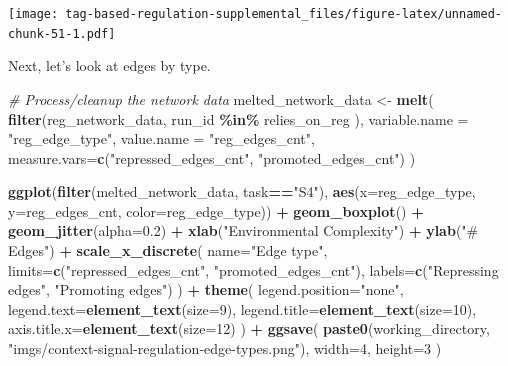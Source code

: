 \documentclass[
]{book}
\newenvironment{Shaded}{\begin{snugshade}}{\end{snugshade}}
\newcommand{\CommentTok}[1]{\textcolor[rgb]{0.56,0.35,0.01}{\textit{#1}}}
\newcommand{\DataTypeTok}[1]{\textcolor[rgb]{0.13,0.29,0.53}{#1}}
\newcommand{\DecValTok}[1]{\textcolor[rgb]{0.00,0.00,0.81}{#1}}
\newcommand{\FloatTok}[1]{\textcolor[rgb]{0.00,0.00,0.81}{#1}}
\newcommand{\KeywordTok}[1]{\textcolor[rgb]{0.13,0.29,0.53}{\textbf{#1}}}
\newcommand{\NormalTok}[1]{#1}
\newcommand{\OperatorTok}[1]{\textcolor[rgb]{0.81,0.36,0.00}{\textbf{#1}}}
\newcommand{\StringTok}[1]{\textcolor[rgb]{0.31,0.60,0.02}{#1}}
\begin{document}
\texttt{[image: tag-based-regulation-supplemental\_files/figure-latex/unnamed-chunk-51-1.pdf]}

Next, let's look at edges by type.

\begin{Shaded}
\begin{Highlighting}[]
\CommentTok{\# Process/cleanup the network data}
\NormalTok{melted\_network\_data \textless{}{-}}\StringTok{ }\KeywordTok{melt}\NormalTok{(}
  \KeywordTok{filter}\NormalTok{(reg\_network\_data,}
\NormalTok{         run\_id }\OperatorTok{\%in\%}\StringTok{ }\NormalTok{relies\_on\_reg}
\NormalTok{        ),}
  \DataTypeTok{variable.name =} \StringTok{"reg\_edge\_type"}\NormalTok{,}
  \DataTypeTok{value.name =} \StringTok{"reg\_edges\_cnt"}\NormalTok{,}
  \DataTypeTok{measure.vars=}\KeywordTok{c}\NormalTok{(}\StringTok{"repressed\_edges\_cnt"}\NormalTok{, }\StringTok{"promoted\_edges\_cnt"}\NormalTok{)}
\NormalTok{)}

\KeywordTok{ggplot}\NormalTok{(}\KeywordTok{filter}\NormalTok{(melted\_network\_data, task}\OperatorTok{==}\StringTok{"S4"}\NormalTok{), }\KeywordTok{aes}\NormalTok{(}\DataTypeTok{x=}\NormalTok{reg\_edge\_type, }\DataTypeTok{y=}\NormalTok{reg\_edges\_cnt, }\DataTypeTok{color=}\NormalTok{reg\_edge\_type)) }\OperatorTok{+}
\StringTok{  }\KeywordTok{geom\_boxplot}\NormalTok{() }\OperatorTok{+}
\StringTok{  }\KeywordTok{geom\_jitter}\NormalTok{(}\DataTypeTok{alpha=}\FloatTok{0.2}\NormalTok{) }\OperatorTok{+}
\StringTok{  }\KeywordTok{xlab}\NormalTok{(}\StringTok{"Environmental Complexity"}\NormalTok{) }\OperatorTok{+}
\StringTok{  }\KeywordTok{ylab}\NormalTok{(}\StringTok{"\# Edges"}\NormalTok{) }\OperatorTok{+}
\StringTok{  }\KeywordTok{scale\_x\_discrete}\NormalTok{(}
    \DataTypeTok{name=}\StringTok{"Edge type"}\NormalTok{,}
    \DataTypeTok{limits=}\KeywordTok{c}\NormalTok{(}\StringTok{"repressed\_edges\_cnt"}\NormalTok{, }\StringTok{"promoted\_edges\_cnt"}\NormalTok{),}
    \DataTypeTok{labels=}\KeywordTok{c}\NormalTok{(}\StringTok{"Repressing edges"}\NormalTok{, }\StringTok{"Promoting edges"}\NormalTok{)}
\NormalTok{  ) }\OperatorTok{+}
\StringTok{  }\KeywordTok{theme}\NormalTok{(}
    \DataTypeTok{legend.position=}\StringTok{"none"}\NormalTok{,}
    \DataTypeTok{legend.text=}\KeywordTok{element\_text}\NormalTok{(}\DataTypeTok{size=}\DecValTok{9}\NormalTok{),}
    \DataTypeTok{legend.title=}\KeywordTok{element\_text}\NormalTok{(}\DataTypeTok{size=}\DecValTok{10}\NormalTok{),}
    \DataTypeTok{axis.title.x=}\KeywordTok{element\_text}\NormalTok{(}\DataTypeTok{size=}\DecValTok{12}\NormalTok{)}
\NormalTok{  ) }\OperatorTok{+}
\StringTok{  }\KeywordTok{ggsave}\NormalTok{(}
    \KeywordTok{paste0}\NormalTok{(working\_directory, }\StringTok{"imgs/context{-}signal{-}regulation{-}edge{-}types.png"}\NormalTok{),}
    \DataTypeTok{width=}\DecValTok{4}\NormalTok{,}
    \DataTypeTok{height=}\DecValTok{3}
\NormalTok{  )}
\end{Highlighting}
\end{Shaded}
\end{document}
